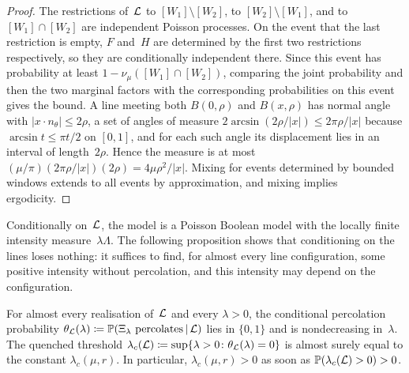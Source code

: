 \documentclass[11pt,letterpaper]{article}
\begin{document}
\begin{proof}
The restrictions of~$\mathcal L$ to $[W_1]\setminus[W_2]$, to $[W_2]\setminus[W_1]$, and to $[W_1]\cap[W_2]$ are independent Poisson processes. On the event that the last restriction is empty, $F$ and~$H$ are determined by the first two restrictions respectively, so they are conditionally independent there. Since this event has probability at least $1-\nu_\mu([W_1]\cap[W_2])$, comparing the joint probability and then the two marginal factors with the corresponding probabilities on this event gives the bound. A line meeting both $B(0,\rho)$ and $B(x,\rho)$ has normal angle with $\lvert x\cdot n_\theta\rvert\le2\rho$, a set of angles of measure $2\arcsin(2\rho/\lvert x\rvert)\le2\pi\rho/\lvert x\rvert$ because $\arcsin t\le\pi t/2$ on $[0,1]$, and for each such angle its displacement lies in an interval of length~$2\rho$. Hence the measure is at most $(\mu/\pi)(2\pi\rho/\lvert x\rvert)(2\rho)=4\mu\rho^2/\lvert x\rvert$. Mixing for events determined by bounded windows extends to all events by approximation, and mixing implies ergodicity.
\end{proof}

Conditionally on~$\mathcal L$, the model is a Poisson Boolean model with the locally finite intensity measure~$\lambda\Lambda$. The following proposition shows that conditioning on the lines loses nothing: it suffices to find, for almost every line configuration, some positive intensity without percolation, and this intensity may depend on the configuration.

\begin{proposition}
\label{prop:quenched}
For almost every realisation of~$\mathcal L$ and every $\lambda>0$, the conditional percolation probability $\theta_\mathcal L(\lambda)\coloneqq\mathbb P(\Xi_\lambda\text{ percolates}\,\vert\,\mathcal L)$ lies in $\{0,1\}$ and is nondecreasing in~$\lambda$. The quenched threshold $\lambda_c(\mathcal L)\coloneqq\sup\{\lambda>0\colon\theta_\mathcal L(\lambda)=0\}$ is almost surely equal to the constant $\lambda_c(\mu,r)$. In particular, $\lambda_c(\mu,r)>0$ as soon as $\mathbb P(\lambda_c(\mathcal L)>0)>0$.
\end{proposition}
\end{document}
